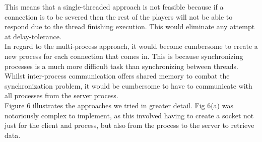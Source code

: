 \documentclass[11pt]{article}
\begin{document}
This means that a single-threaded approach is not feasible because if a connection is to be severed then the rest of the players will not be able to respond due to the thread finishing execution. This would eliminate any attempt at delay-tolerance. \\

In regard to the multi-process approach, it would become cumbersome to create a new process for each connection that comes in. This is because synchronizing processes is a much more difficult task than synchronizing between threads. Whilst inter-process communication offers shared memory \citep{shared_memory} to combat the synchronization problem, it would be cumbersome to have to communicate with all processes from the server process.\\
\newpage
Figure 6 illustrates the approaches we tried in greater detail. Fig 6(a) was notoriously complex to implement, as this involved having to create a socket not just for the client and process, but also from the process to the server to retrieve data. \\
\end{document}
